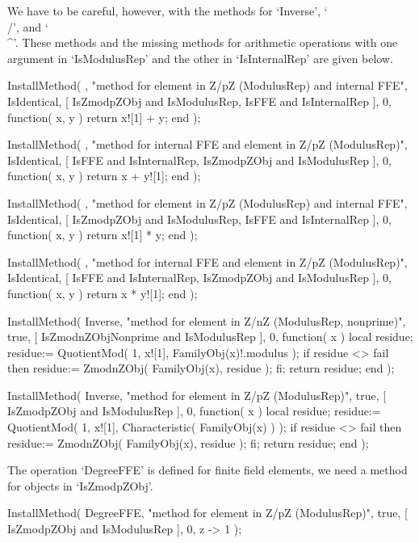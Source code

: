We have to be careful, however, with the methods for `Inverse', `\\/',
and `\\^'.
These methods and the missing methods for arithmetic operations with
one argument in `IsModulusRep' and the other in `IsInternalRep'
are given below.

\begintt
    InstallMethod( \+,
        "method for element in Z/pZ (ModulusRep) and internal FFE",
        IsIdentical,
        [ IsZmodpZObj and IsModulusRep, IsFFE and IsInternalRep ], 0,
        function( x, y ) return x![1] + y; end );

    InstallMethod( \+,
        "method for internal FFE and element in Z/pZ (ModulusRep)",
        IsIdentical,
        [ IsFFE and IsInternalRep, IsZmodpZObj and IsModulusRep ], 0,
        function( x, y ) return x + y![1]; end );

    InstallMethod( \*,
        "method for element in Z/pZ (ModulusRep) and internal FFE",
        IsIdentical,
        [ IsZmodpZObj and IsModulusRep, IsFFE and IsInternalRep ], 0,
        function( x, y ) return x![1] * y; end );

    InstallMethod( \*,
        "method for internal FFE and element in Z/pZ (ModulusRep)",
        IsIdentical,
        [ IsFFE and IsInternalRep, IsZmodpZObj and IsModulusRep ], 0,
        function( x, y ) return x * y![1]; end );

    InstallMethod( Inverse,
        "method for element in Z/nZ (ModulusRep, nonprime)",
        true,
        [ IsZmodnZObjNonprime and IsModulusRep ], 0,
        function( x )
        local residue;
        residue:= QuotientMod( 1, x![1], FamilyObj(x)!.modulus );
        if residue <> fail then
          residue:= ZmodnZObj( FamilyObj(x), residue );
        fi;
        return residue;
        end );

    InstallMethod( Inverse,
        "method for element in Z/pZ (ModulusRep)",
        true,
        [ IsZmodpZObj and IsModulusRep ], 0,
        function( x )
        local residue;
        residue:= QuotientMod( 1, x![1], Characteristic( FamilyObj(x) ) );
        if residue <> fail then
          residue:= ZmodnZObj( FamilyObj(x), residue );
        fi;
        return residue;
        end );
\endtt

The operation `DegreeFFE' is defined for finite field elements,
we need a method for objects in `IsZmodpZObj'.

\begintt
    InstallMethod( DegreeFFE,
        "method for element in Z/pZ (ModulusRep)",
        true,
        [ IsZmodpZObj and IsModulusRep ], 0,
        z -> 1 );
\endtt


